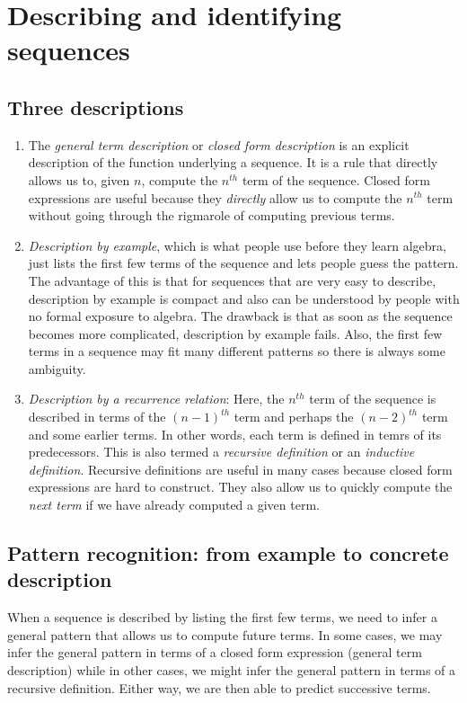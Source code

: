 \documentclass{amsart}
\begin{document}
\section{Describing and identifying sequences}

\subsection{Three descriptions}

\begin{enumerate}
\item The {\em general term description} or {\em closed form
  description} is an explicit description of the function underlying a
  sequence. It is a rule that directly allows us to, given $n$,
  compute the $n^{th}$ term of the sequence. Closed form expressions
  are useful because they {\em directly} allow us to compute the
  $n^{th}$ term without going through the rigmarole of computing
  previous terms.
\item {\em Description by example}, which is what people use before
  they learn algebra, just lists the first few terms of the sequence
  and lets people guess the pattern. The advantage of this is that for
  sequences that are very easy to describe, description by example is
  compact and also can be understood by people with no formal exposure
  to algebra. The drawback is that as soon as the sequence becomes
  more complicated, description by example fails. Also, the first few
  terms in a sequence may fit many different patterns so there is
  always some ambiguity. 
\item {\em Description by a recurrence relation}: Here, the $n^{th}$
  term of the sequence is described in terms of the $(n-1)^{th}$ term
  and perhaps the $(n-2)^{th}$ term and some earlier terms. In other
  words, each term is defined in temrs of its predecessors. This is
  also termed a {\em recursive definition} or an {\em inductive
  definition}. Recursive definitions are useful in many cases because
  closed form expressions are hard to construct. They also allow us to
  quickly compute the {\em next term} if we have already computed a
  given term.
\end{enumerate}

\subsection{Pattern recognition: from example to concrete description}

When a sequence is described by listing the first few terms, we need
to infer a general pattern that allows us to compute future terms. In
some cases, we may infer the general pattern in terms of a closed form
expression (general term description) while in other cases, we might
infer the general pattern in terms of a recursive definition. Either
way, we are then able to predict successive terms.
\end{document}
